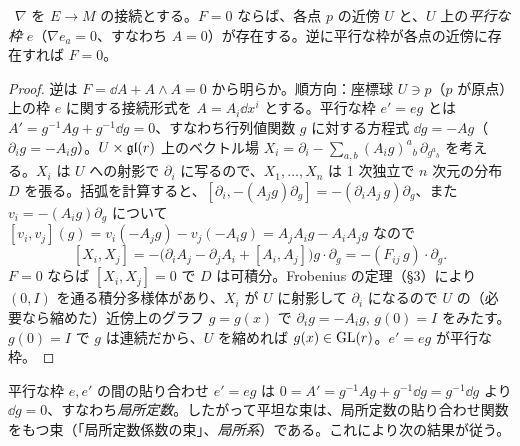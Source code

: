 \begin{thm}[平坦接続の局所自明性]\label{C:thm:flat}\tP\
$\nabla$ を $E\to M$ の接続とする。$F=0$ ならば、各点 $p$ の近傍 $U$ と、$U$ 上の\emph{平行な枠} $e$（$\nabla e_a=0$、すなわち $A=0$）が存在する。逆に平行な枠が各点の近傍に存在すれば $F=0$。
\end{thm}
\begin{proof}
逆は $F=\dd A+A\wedge A=0$ から明らか。順方向：座標球 $U\ni p$（$p$ が原点）上の枠 $e$ に関する接続形式を $A=A_i\dd x^i$ とする。平行な枠 $e'=eg$ とは $A'=g^{-1}Ag+g^{-1}\dd g=0$、すなわち行列値関数 $g$ に対する方程式 $\dd g=-Ag$（$\partial_ig=-A_ig$）。$U\times\mathfrak{gl}(r)$ 上のベクトル場 $X_i=\partial_i-\sum_{a,b}(A_ig)^a{}_b\,\partial_{g^a{}_b}$ を考える。$X_i$ は $U$ への射影で $\partial_i$ に写るので、$X_1,\dots,X_n$ は 1 次独立で $n$ 次元の分布 $D$ を張る。括弧を計算すると、$[\partial_i,-(A_jg)\partial_g]=-(\partial_iA_j\,g)\partial_g$、また $v_i=-(A_ig)\partial_g$ について $[v_i,v_j](g)=v_i(-A_jg)-v_j(-A_ig)=A_jA_ig-A_iA_jg$ なので
\[
[X_i,X_j]=-\bigl(\partial_iA_j-\partial_jA_i+[A_i,A_j]\bigr)g\cdot\partial_g=-(F_{ij}\,g)\cdot\partial_g.
\]
$F=0$ ならば $[X_i,X_j]=0$ で $D$ は可積分。Frobenius の定理（§3）により $(0,I)$ を通る積分多様体があり、$X_i$ が $U$ に射影して $\partial_i$ になるので $U$ の（必要なら縮めた）近傍上のグラフ $g=g(x)$ で $\partial_ig=-A_ig$, $g(0)=I$ をみたす。$g(0)=I$ で $g$ は連続だから、$U$ を縮めれば $g(x)\in\mathrm{GL}(r)$。$e'=eg$ が平行な枠。
\end{proof}
平行な枠 $e,e'$ の間の貼り合わせ $e'=eg$ は $0=A'=g^{-1}Ag+g^{-1}\dd g=g^{-1}\dd g$ より $\dd g=0$、すなわち\emph{局所定数}。したがって平坦な束は、局所定数の貼り合わせ関数をもつ束（「局所定数係数の束」、\emph{局所系}）である。これにより次の結果が従う。

